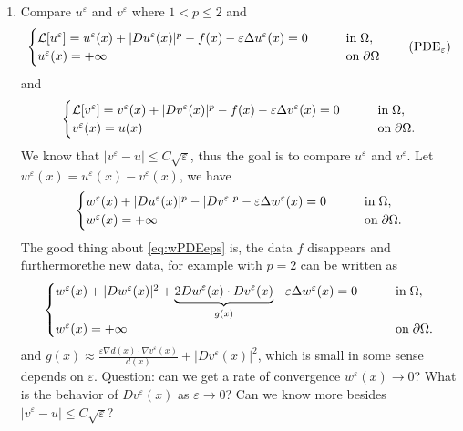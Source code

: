 \documentclass[english,reqno]{amsart}
\begin{document}
\begin{enumerate}[label=\arabic*)]
\item Compare $u^\varepsilon$ and $v^\varepsilon$ where $1<p\leq 2$ and
\begin{equation}\label{eq:PDEeps}
    \begin{cases}
   \mathcal{L}[u^\varepsilon] =  u^\varepsilon(x) + |Du^\varepsilon(x)|^p - f(x) - \varepsilon \Delta u^\varepsilon(x) = 0 &\qquad
    \text{in}\;\Omega, \vspace{0cm}\\
   u^\varepsilon(x) = +\infty &\qquad
    \text{on}\;\partial\Omega
    \end{cases} \tag{PDE$_\varepsilon$}
\end{equation}
and
\begin{equation}\label{eq:vPDEeps}
    \begin{cases}
   \mathcal{L}[v^\varepsilon] =  v^\varepsilon(x) + |Dv^\varepsilon(x)|^p - f(x) - \varepsilon \Delta v^\varepsilon(x) = 0 &\qquad
    \text{in}\;\Omega, \vspace{0cm}\\
   v^\varepsilon(x) = u(x) &\qquad
    \text{on}\;\partial\Omega.
    \end{cases} 
\end{equation}
We know that $|v^\varepsilon - u|\leq C\sqrt{\varepsilon}$, thus the goal is to compare $u^\varepsilon$ and $v^\varepsilon$. Let $w^\varepsilon(x) = u^\varepsilon(x) - v^\varepsilon(x)$, we have
\begin{equation}\label{eq:wPDEeps}
    \begin{cases}
w^\varepsilon(x) + |Du^\varepsilon(x)|^p  - |Dv^\varepsilon|^p - \varepsilon \Delta w^\varepsilon(x) = 0 &\qquad
    \text{in}\;\Omega, \vspace{0cm}\\
   w^\varepsilon(x) = +\infty &\qquad
    \text{on}\;\partial\Omega.
    \end{cases} 
\end{equation}
The good thing about \eqref{eq:wPDEeps} is, the data $f$ disappears and furthermorethe new data, for example with $p=2$ can be written as
\begin{equation}\label{eq:wwPDEeps}
    \begin{cases}
w^\varepsilon(x) + |Dw^\varepsilon(x)|^2 +\underbrace{2Dw^\varepsilon(x)\cdot Dv^\varepsilon(x)}_{g
(x)} - \varepsilon \Delta w^\varepsilon(x) = 0 &\qquad
    \text{in}\;\Omega, \vspace{0cm}\\
   w^\varepsilon(x) = +\infty &\qquad
    \text{on}\;\partial\Omega.
    \end{cases} 
\end{equation}
and $g(x) \approx \frac{\varepsilon \nabla d(x)\cdot \nabla v^\varepsilon(x)}{d(x)} + |Dv^\varepsilon(x)|^2$, which is small in some sense depends on $\varepsilon$. Question: can we get a rate of convergence $w^\varepsilon(x)\to 0$? What is the behavior of $Dv^\varepsilon(x)$ as $\varepsilon\to 0$? Can we know more besides $|v^\varepsilon - u|\leq C\sqrt{\varepsilon}$?
\end{enumerate}
\end{document}

